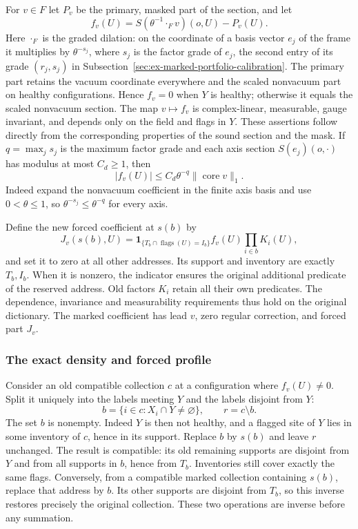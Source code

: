 For $v\in F$ let $P_v$ be the primary, masked part of the section, and
let
\[
 f_v(U)=S(\theta^{-1}\mathbin{\cdot_F}v)(o,U)-P_v(U).
 \label{eq:terminal-supplement}
\]
Here $\cdot_F$ is the graded dilation: on the coordinate of a basis
vector $e_j$ of the frame it multiplies by $\theta^{-s_j}$, where $s_j$
is the factor grade of $e_j$, the second entry of its grade $(r_j,s_j)$
in Subsection~\ref{sec:ex-marked-portfolio-calibration}. The primary part retains the vacuum
coordinate everywhere and the scaled nonvacuum part on healthy
configurations. Hence $f_v=0$ when $Y$ is healthy; otherwise it equals
the scaled nonvacuum section. The map $v\mapsto f_v$ is complex-linear,
measurable, gauge invariant, and depends only on the field and flags in
$Y$. These assertions follow directly from the corresponding properties
of the sound section and the mask. If $q=\max_js_j$ is the maximum
factor grade and each axis section $S(e_j)(o,\cdot)$ has modulus at most
$C_d\ge1$, then
\begin{equation}
 |f_v(U)|\le C_d\theta^{-q}\|\operatorname{core}v\|_1.
 \label{eq:terminal-marked-construction-display-T1}
\end{equation}
Indeed expand the nonvacuum coefficient in the finite axis basis and
use $0<\theta\le1$, so $\theta^{-s_j}\le\theta^{-q}$ for every axis.

Define the new forced coefficient at $s(b)$ by
\begin{equation}
 J_v(s(b),U)=\mathbf1_{\{T_b\cap\operatorname{flags}(U)=I_b\}}
                f_v(U)\prod_{i\in b}K_i(U),
 \label{eq:terminal-marked-construction-display-T2}
\end{equation}
and set it to zero at all other addresses. Its support and inventory
are exactly $T_b,I_b$. When it is nonzero, the indicator ensures the
original additional predicate of the reserved address. Old factors
$K_i$ retain all their own predicates. The dependence, invariance and
measurability requirements thus hold on the original dictionary.
The marked coefficient has lead $v$, zero regular correction, and
forced part $J_v$.

\subsubsection{The exact density and forced profile}
Consider an old compatible collection $c$ at a configuration where
$f_v(U)\ne0$. Split it uniquely into the labels meeting $Y$ and the
labels disjoint from $Y$:
\[
 b=\{i\in c:X_i\cap Y\ne\varnothing\},\qquad r=c\setminus b.
\]
The set $b$ is nonempty. Indeed $Y$ is then not healthy, and a flagged
site of $Y$ lies in some inventory of $c$, hence in its support.
Replace $b$ by $s(b)$ and leave $r$ unchanged. The result is compatible:
its old remaining supports are disjoint from $Y$ and from all supports
in $b$, hence from $T_b$. Inventories still cover exactly the same
flags. Conversely, from a compatible marked collection containing
$s(b)$, replace that address by $b$. Its other supports are disjoint
from $T_b$, so this inverse restores precisely the original collection.
These two operations are inverse before any summation.

